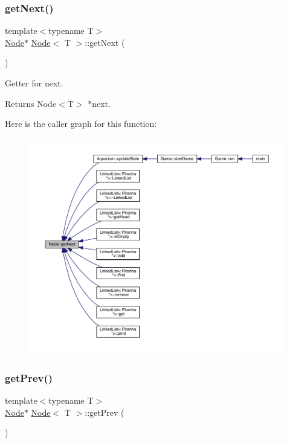 \subsubsection{\texorpdfstring{get\+Next()}{getNext()}}
{\footnotesize\ttfamily template$<$typename T$>$ \\
\mbox{\hyperlink{class_node}{Node}}$\ast$ \mbox{\hyperlink{class_node}{Node}}$<$ T $>$\+::get\+Next (\begin{DoxyParamCaption}{ }\end{DoxyParamCaption})\hspace{0.3cm}{\ttfamily [inline]}}



Getter for next. 

\begin{DoxyReturn}{Returns}
Node$<$\+T$>$ $\ast$next. 
\end{DoxyReturn}
Here is the caller graph for this function\+:\nopagebreak
\begin{figure}[H]
\begin{center}
\leavevmode
\includegraphics[width=350pt]{class_node_aaf2b6c875d0972479da9a26fca47db54_icgraph}
\end{center}
\end{figure}
\mbox{\label{class_node_ac19243714fdd3b932dfc4de33f87f158}} 
\subsubsection{\texorpdfstring{get\+Prev()}{getPrev()}}
{\footnotesize\ttfamily template$<$typename T$>$ \\
\mbox{\hyperlink{class_node}{Node}}$\ast$ \mbox{\hyperlink{class_node}{Node}}$<$ T $>$\+::get\+Prev (\begin{DoxyParamCaption}{ }\end{DoxyParamCaption})\hspace{0.3cm}{\ttfamily [inline]}}



